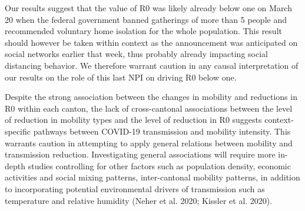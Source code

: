 Our results suggest that the value of R0 was likely already below one on March 20 when the federal government banned gatherings of more than 5 people and recommended voluntary home isolation for the whole population. This result should however be taken within context as the announcement was anticipated on social networks earlier that week, thus probably already impacting social distancing behavior. We therefore warrant caution in any causal interpretation of our results on the role of this last NPI on driving R0 below one.

Despite the strong association between the changes in mobility and reductions in R0 within each canton, the lack of cross-cantonal associations between the level of reduction in mobility types and the level of reduction in R0 suggests context-specific pathways between COVID-19 transmission and mobility intensity. This warrants caution in attempting to apply general relations between mobility and transmission reduction. Investigating general associations will require more in-depth studies controlling for other factors such as population density, economic activities and social mixing patterns, inter-cantonal mobility patterns, in addition to incorporating potential environmental drivers of transmission such as temperature and relative humidity (Neher et al. 2020; Kissler et al. 2020).

